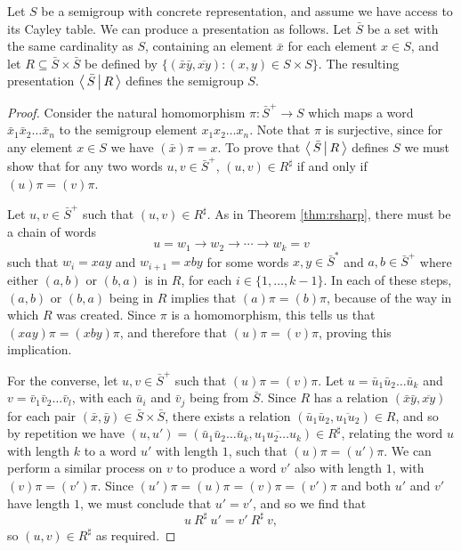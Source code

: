 \begin{method}
  \label{meth:trivial-presentation}
  Let $S$ be a semigroup with concrete representation, and assume we have access to its Cayley
  table.  We can produce a presentation as follows.  Let $\bar S$ be a set with
  the same cardinality as $S$, containing an element $\bar{x}$ for each element
  $x \in S$, and let $R \subseteq \bar{S} \times \bar{S}$ be defined by
  $\{(\bar{x}\bar{y}, \overline{xy}) : (x,y) \in S \times S\}.$ The resulting
  presentation $\left\langle \, \bar{S} \, \middle| \, R \, \right\rangle$ defines the semigroup $S$.

  \begin{proof}
    Consider the natural homomorphism $\pi: \bar{S}^+ \to S$ which maps a word
    $\bar{x}_1\bar{x}_2\ldots \bar{x}_n$ to the semigroup element
    $x_1 x_2\ldots x_n$.
    Note that $\pi$ is surjective, since for any element $x \in S$ we have
    $(\bar{x})\pi = x$.
    To prove that $\left\langle \, \bar{S} \, \middle| \, R \, \right\rangle$ defines $S$ we must
    show that for any two words $u, v \in \bar{S}^+$, $(u, v) \in R^\sharp$ if
    and only if $(u)\pi = (v)\pi$.

    Let $u,v \in \bar{S}^+$ such that $(u, v) \in R^\sharp$.  As in Theorem
    \ref{thm:rsharp}, there must be a chain of words
    $$u = w_1 \to w_2 \to \cdots \to w_k = v$$
    such that $w_i = xay$ and $w_{i+1} = xby$ for some words $x,y \in \bar{S}^*$ and
    $a,b \in \bar{S}^+$ where either $(a,b)$ or $(b,a)$ is in $R$, for each
    $i \in \{1, \ldots, k-1\}$.  In each of these steps, $(a,b)$ or $(b,a)$
    being in $R$ implies that $(a)\pi = (b)\pi$, because of the way in which $R$
    was created.  Since $\pi$ is a homomorphism, this tells us that
    $(xay)\pi = (xby)\pi$, and therefore that $(u)\pi = (v)\pi$, proving this
    implication.

    For the converse, let $u,v \in \bar{S}^+$ such that $(u)\pi = (v)\pi$.  Let
    $u = \bar{u}_1\bar{u}_2\ldots \bar{u}_k$ and $v = \bar{v}_1\bar{v}_2\ldots \bar{v}_l$, with each $\bar{u}_i$ and $\bar{v}_j$
    being from $\bar{S}$.  Since $R$ has a relation $(\bar{x}\bar{y}, \overline{xy})$ for each
    pair $(\bar{x},\bar{y}) \in \bar{S} \times \bar{S}$, there exists a relation
    $(\bar{u}_1\bar{u}_2, \overline{u_1u_2}) \in R$, and so by repetition we have
    $(u, u') = (\bar{u}_1\bar{u}_2\ldots \bar{u}_k, \overline{u_1u_2\ldots u_k}) \in R^\sharp$, relating the
    word $u$ with length $k$ to a word $u'$ with length $1$, such that
    $(u)\pi = (u')\pi$.  We can perform
    a similar process on $v$ to produce a word $v'$ also with length $1$, with
    $(v)\pi = (v')\pi$.
    Since $(u')\pi = (u)\pi = (v)\pi = (v')\pi$ and both $u'$ and $v'$
    have length $1$, we must conclude that $u' = v'$, and so we
    find that
    $$u ~R^\sharp~ u' = v' ~R^\sharp~ v,$$
    so $(u,v) \in R^\sharp$ as required.
  \end{proof}
\end{method}

